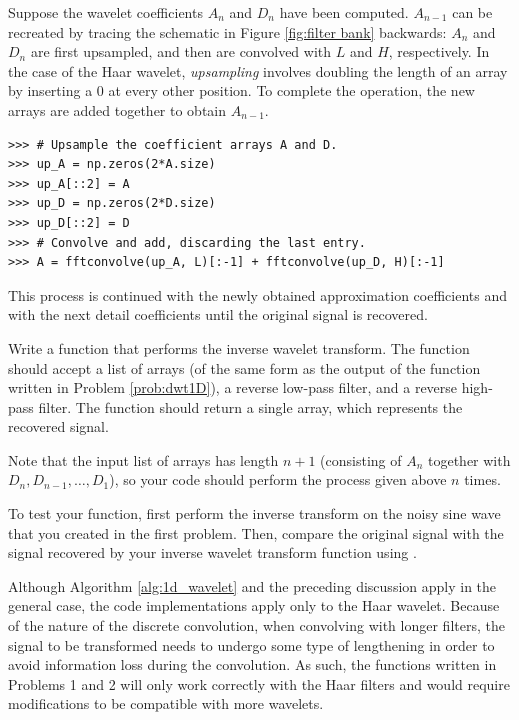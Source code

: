 Suppose the wavelet coefficients $A_n$ and $D_n$ have been computed.
$A_{n-1}$ can be recreated by tracing the schematic in Figure \ref{fig:filter bank} backwards: $A_n$ and $D_n$ are first upsampled, and then are convolved with $L$ and $H$, respectively.
In the case of the Haar wavelet, \emph{upsampling} involves doubling the length of an array by inserting a 0 at every other position.
To complete the operation, the new arrays are added together to obtain $A_{n-1}$.

\begin{lstlisting}
>>> # Upsample the coefficient arrays A and D.
>>> up_A = np.zeros(2*A.size)
>>> up_A[::2] = A
>>> up_D = np.zeros(2*D.size)
>>> up_D[::2] = D
>>> # Convolve and add, discarding the last entry.
>>> A = fftconvolve(up_A, L)[:-1] + fftconvolve(up_D, H)[:-1]
\end{lstlisting}

This process is continued with the newly obtained approximation coefficients and with the next detail coefficients until the original signal is recovered.

\begin{problem} %
Write a function that performs the inverse wavelet transform.
The function should accept a list of arrays (of the same form as the output of the function written in Problem \ref{prob:dwt1D}), a reverse low-pass filter, and a reverse high-pass filter.
The function should return a single array, which represents the recovered signal.

Note that the input list of arrays has length $n+1$ (consisting of $A_n$ together with $D_n, D_{n-1}, \ldots, D_1$), so your code should perform the process given above $n$ times.

To test your function, first perform the inverse transform on the noisy sine wave that you created in the first problem.
Then, compare the original signal with the signal recovered by your inverse wavelet transform function using .
\end{problem}

\begin{info}
Although Algorithm \ref{alg:1d_wavelet} and the preceding discussion apply in the general case, the code implementations apply only to the Haar wavelet.
Because of the nature of the discrete convolution, when convolving with longer filters, the signal to be transformed needs to undergo some type of lengthening in order to avoid
information loss during the convolution.
As such, the functions written in Problems 1 and 2 will only work correctly with the Haar filters and would require modifications to be compatible with more wavelets.
\end{info}

